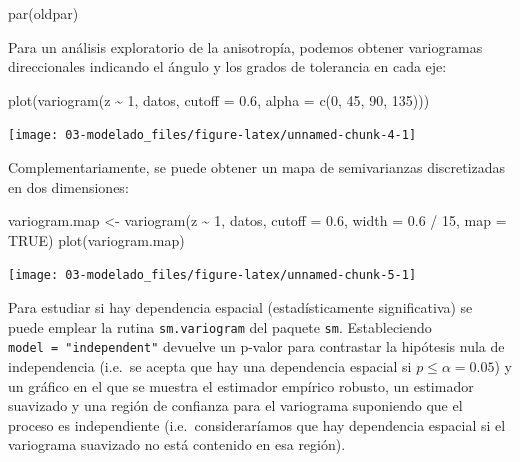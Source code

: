 \documentclass[
  spanish,
]{book}
\newenvironment{Shaded}{\begin{snugshade}}{\end{snugshade}}
\newcommand{\AttributeTok}[1]{\textcolor[rgb]{0.77,0.63,0.00}{#1}}
\newcommand{\ConstantTok}[1]{\textcolor[rgb]{0.00,0.00,0.00}{#1}}
\newcommand{\DecValTok}[1]{\textcolor[rgb]{0.00,0.00,0.81}{#1}}
\newcommand{\FloatTok}[1]{\textcolor[rgb]{0.00,0.00,0.81}{#1}}
\newcommand{\FunctionTok}[1]{\textcolor[rgb]{0.00,0.00,0.00}{#1}}
\newcommand{\NormalTok}[1]{#1}
\newcommand{\OtherTok}[1]{\textcolor[rgb]{0.56,0.35,0.01}{#1}}
\newcommand{\SpecialCharTok}[1]{\textcolor[rgb]{0.00,0.00,0.00}{#1}}
\theoremstyle{break}
\begin{document}
\begin{Shaded}
\begin{Highlighting}[]
\FunctionTok{par}\NormalTok{(oldpar)}
\end{Highlighting}
\end{Shaded}

Para un análisis exploratorio de la anisotropía, podemos obtener variogramas direccionales indicando el ángulo y los grados de tolerancia en cada eje:

\begin{Shaded}
\begin{Highlighting}[]
\FunctionTok{plot}\NormalTok{(}\FunctionTok{variogram}\NormalTok{(z }\SpecialCharTok{\textasciitilde{}} \DecValTok{1}\NormalTok{, datos, }\AttributeTok{cutoff =} \FloatTok{0.6}\NormalTok{, }\AttributeTok{alpha =} \FunctionTok{c}\NormalTok{(}\DecValTok{0}\NormalTok{, }\DecValTok{45}\NormalTok{, }\DecValTok{90}\NormalTok{, }\DecValTok{135}\NormalTok{)))}
\end{Highlighting}
\end{Shaded}

\begin{center}\texttt{[image: 03-modelado\_files/figure-latex/unnamed-chunk-4-1]} \end{center}

Complementariamente, se puede obtener un mapa de semivarianzas discretizadas en dos dimensiones:

\begin{Shaded}
\begin{Highlighting}[]
\NormalTok{variogram.map }\OtherTok{\textless{}{-}} \FunctionTok{variogram}\NormalTok{(z }\SpecialCharTok{\textasciitilde{}} \DecValTok{1}\NormalTok{, datos, }\AttributeTok{cutoff =} \FloatTok{0.6}\NormalTok{, }\AttributeTok{width =} \FloatTok{0.6} \SpecialCharTok{/} \DecValTok{15}\NormalTok{, }\AttributeTok{map =} \ConstantTok{TRUE}\NormalTok{)}
\FunctionTok{plot}\NormalTok{(variogram.map)}
\end{Highlighting}
\end{Shaded}

\begin{center}\texttt{[image: 03-modelado\_files/figure-latex/unnamed-chunk-5-1]} \end{center}

Para estudiar si hay dependencia espacial (estadísticamente significativa) se puede emplear la rutina \texttt{sm.variogram} del paquete \texttt{sm}.
Estableciendo \texttt{model\ =\ "independent"} devuelve un p-valor para contrastar la hipótesis nula de independencia
(i.e.~se acepta que hay una dependencia espacial si \(p \leq \alpha = 0.05\)) y un gráfico en el que se muestra el estimador empírico robusto, un estimador suavizado y una región de confianza para el variograma suponiendo que el proceso es independiente (i.e.~consideraríamos que hay dependencia espacial si el variograma suavizado no está contenido en esa región).
\end{document}

